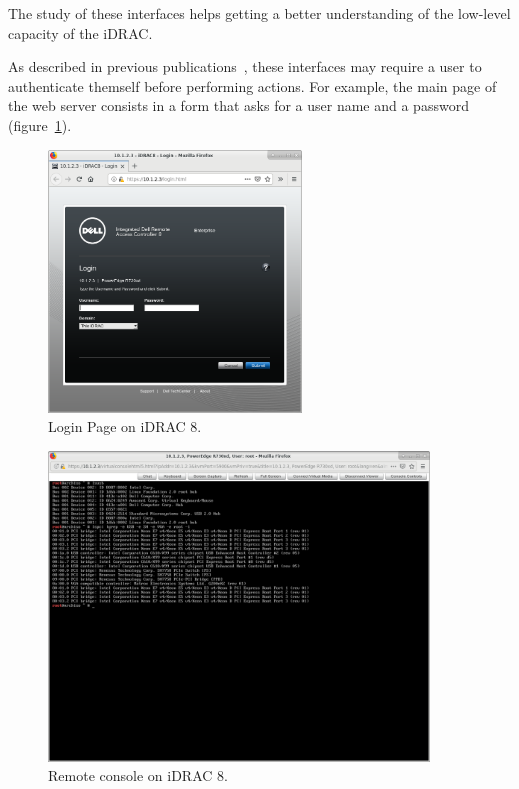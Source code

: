 The study of these interfaces helps getting a better understanding of the low-level capacity of the iDRAC.

As described in previous publications~\cite{idrackar:usenix2013ipmi}, these interfaces may require a user to authenticate themself before performing actions.
For example, the main page of the web server consists in a form that asks for a user name and a password (figure~\ref{fig:idrackar:login-page}).

\begin{figure}[p]
  \centering
  \includegraphics[width=0.6\textwidth]{03-idrackar/img/login-page.png}
  \caption{Login Page on iDRAC 8.}
  \label{fig:idrackar:login-page}
\end{figure}

\begin{figure}[p]
  \centering
  \includegraphics[width=0.9\textwidth]{03-idrackar/img/console-lspci-lsusb.png}
  \caption{Remote console on iDRAC 8.}
  \label{fig:idrackar:console-lspci-lsusb}
\end{figure}

